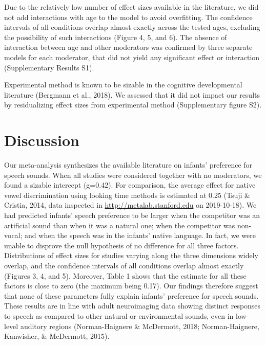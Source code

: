 \documentclass[man]{apa6}
\begin{document}
Due to the relatively low number of effect sizes available in the
literature, we did not add interactions with age to the model to avoid
overfitting. The confidence intervals of all conditions overlap almost
exactly across the tested ages, excluding the possibility of such
interactions (Figure 4, 5, and 6). The absence of interaction between
age and other moderators was confirmed by three separate models for each
moderator, that did not yield any significant effect or interaction
(Supplementary Results S1).

Experimental method is known to be sizable in the cognitive
developmental literature (Bergmann et al., 2018). We assessed that it
did not impact our results by residualizing effect sizes from
experimental method (Supplementary figure S2).

\section{Discussion}\label{discussion}

Our meta-analysis synthesizes the available literature on infants'
preference for speech sounds. When all studies were considered together
with no moderators, we found a sizable intercept (g=0.42). For
comparison, the average effect for native vowel discrimination using
looking time methods is estimated at 0.25 (Tsuji \& Cristia, 2014, data
inspected in \url{http://metalab.stanford.edu} on 2019-10-18). We had
predicted infants' speech preference to be larger when the competitor
was an artificial sound than when it was a natural one; when the
competitor was non-vocal; and when the speech was in the infants' native
language. In fact, we were unable to disprove the null hypothesis of no
difference for all three factors. Distributions of effect sizes for
studies varying along the three dimensions widely overlap, and the
confidence intervals of all conditions overlap almost exactly (Figures
3, 4, and 5). Moreover, Table 1 shows that the estimate for all these
factors is close to zero (the maximum being 0.17). Our findings
therefore suggest that none of these parameters fully explain infants'
preference for speech sounds. These results are in line with adult
neuroimaging data showing distinct responses to speech as compared to
other natural or environmental sounds, even in low-level auditory
regions (Norman-Haignere \& McDermott, 2018; Norman-Haignere, Kanwisher,
\& McDermott, 2015).
\end{document}
